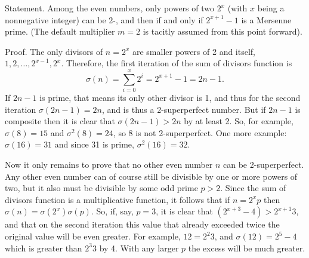 \documentclass[12pt]{article}
\begin{document}
Statement. Among the even numbers, only powers of two $2^x$ (with $x$ being a nonnegative integer) can be 2-, and then if and only if $2^{x + 1} - 1$ is a Mersenne prime. (The default multiplier $m = 2$ is tacitly assumed from this point forward).

Proof. The only divisors of $n = 2^x$ are smaller powers of 2 and itself, $1, 2, \ldots , 2^{x - 1}, 2^x$. Therefore, the first iteration of the sum of divisors function is $$\sigma(n) = \sum_{i = 0}^x 2^i = 2^{x + 1} - 1 = 2n - 1.$$ If $2n - 1$ is prime, that means its only other divisor is 1, and thus for the second iteration $\sigma(2n - 1) = 2n$, and is thus a 2-superperfect number. But if $2n - 1$ is composite then it is clear that $\sigma(2n - 1) > 2n$ by at least 2. So, for example, $\sigma(8) = 15$ and $\sigma^2(8) = 24$, so 8 is not 2-superperfect. One more example: $\sigma(16) = 31$ and since 31 is prime, $\sigma^2(16) = 32$.

Now it only remains to prove that no other even number $n$ can be 2-superperfect. Any other even number can of course still be divisible by one or more powers of two, but it also must be divisible by some odd prime $p > 2$. Since the sum of divisors function is a multiplicative function, it follows that if $n = 2^xp$ then $\sigma(n) = \sigma(2^x)\sigma(p)$. So, if, say, $p = 3$, it is clear that $(2^{x + 3} - 4) > 2^{x + 1}3$, and that on the second iteration this value that already exceeded twice the original value will be even greater. For example, $12 = 2^2 3$, and $\sigma(12) = 2^5 - 4$ which is greater than $2^3 3$ by 4. With any larger $p$ the excess will be much greater.
\end{document}
